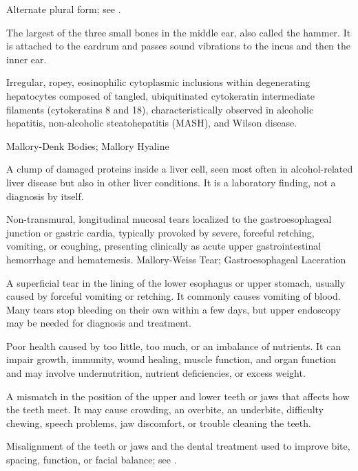  Alternate plural form; see .

 The largest of the three small bones in the middle ear, also called the hammer. It is attached to the eardrum and passes sound vibrations to the incus and then the inner ear.

 Irregular, ropey, eosinophilic cytoplasmic inclusions within degenerating hepatocytes composed of tangled, ubiquitinated cytokeratin intermediate filaments (cytokeratins 8 and 18), characteristically observed in alcoholic hepatitis, non-alcoholic steatohepatitis (MASH), and Wilson disease.

\synonyms
Mallory-Denk Bodies; Mallory Hyaline

 A clump of damaged proteins inside a liver cell, seen most often in alcohol-related liver disease but also in other liver conditions. It is a laboratory finding, not a diagnosis by itself.

 Non-transmural, longitudinal mucosal tears localized to the gastroesophageal junction or gastric cardia, typically provoked by severe, forceful retching, vomiting, or coughing, presenting clinically as acute upper gastrointestinal hemorrhage and hematemesis.
\synonyms
Mallory-Weiss Tear; Gastroesophageal Laceration

 A superficial tear in the lining of the lower esophagus or upper stomach, usually caused by forceful vomiting or retching. It commonly causes vomiting of blood. Many tears stop bleeding on their own within a few days, but upper endoscopy may be needed for diagnosis and treatment.

 Poor health caused by too little, too much, or an imbalance of nutrients. It can impair growth, immunity, wound healing, muscle function, and organ function and may involve undernutrition, nutrient deficiencies, or excess weight.

 A mismatch in the position of the upper and lower teeth or jaws that affects how the teeth meet. It may cause crowding, an overbite, an underbite, difficulty chewing, speech problems, jaw discomfort, or trouble cleaning the teeth.

 Misalignment of the teeth or jaws and the dental treatment used to improve bite, spacing, function, or facial balance; see .

